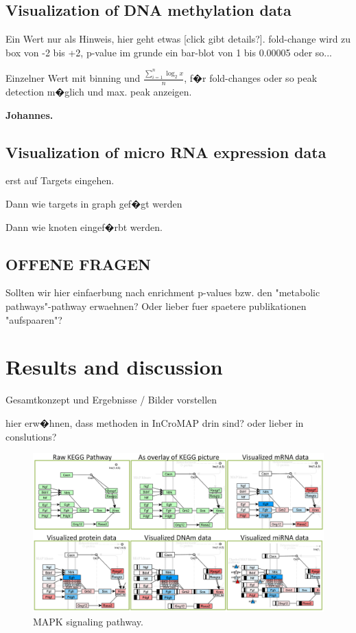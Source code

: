 \documentclass{bioinfo}
\begin{document}
\subsection{Visualization of DNA methylation data}

Ein Wert nur als Hinweis, hier geht etwas [click gibt details?]. fold-change wird zu box von -2 bis +2, p-value im grunde ein bar-blot von 1 bis 0.00005 oder so...

Einzelner Wert mit binning und $\frac{\sum\limits_{i=1}^n\log_2 x}{n}$, f�r fold-changes oder so peak detection m�glich und max. peak anzeigen.

\textbf{Johannes.}


\subsection{Visualization of micro RNA expression data}
erst auf Targets eingehen.

Dann wie targets in graph gef�gt werden

Dann wie knoten eingef�rbt werden.


\subsection{OFFENE FRAGEN}
Sollten wir hier einfaerbung nach enrichment p-values bzw. den "metabolic pathways"-pathway erwaehnen? Oder lieber fuer spaetere publikationen "aufspaaren"?




\section{Results and discussion}

Gesamtkonzept und Ergebnisse / Bilder vorstellen

hier erw�hnen, dass methoden in InCroMAP drin sind? oder lieber in conslutions?






\begin{figure}[t]
\centering
\includegraphics[width=1.0\textwidth]{figures/visualization-steps.png}
\caption{MAPK signaling pathway.}\label{fig:visualization_steps}
\end{figure}
\end{document}
